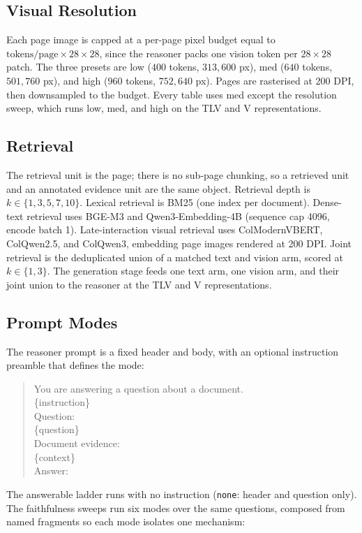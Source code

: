 \subsection{Visual Resolution}
\label{app:cfg_resolution}
Each page image is capped at a per-page pixel budget equal to $\text{tokens/page} \times 28 \times 28$, since the reasoner packs one vision token per $28\times28$ patch. The three presets are low ($400$ tokens, $313{,}600$ px), med ($640$ tokens, $501{,}760$ px), and high ($960$ tokens, $752{,}640$ px). Pages are rasterised at 200 DPI, then downsampled to the budget. Every table uses med except the resolution sweep, which runs low, med, and high on the TLV and V representations.

\subsection{Retrieval}
\label{app:cfg_retrieval}
The retrieval unit is the page; there is no sub-page chunking, so a retrieved unit and an annotated evidence unit are the same object. Retrieval depth is $k \in \{1,3,5,7,10\}$. Lexical retrieval is BM25 (one index per document). Dense-text retrieval uses BGE-M3 and Qwen3-Embedding-4B (sequence cap 4096, encode batch 1). Late-interaction visual retrieval uses ColModernVBERT, ColQwen2.5, and ColQwen3, embedding page images rendered at 200 DPI. Joint retrieval is the deduplicated union of a matched text and vision arm, scored at $k \in \{1,3\}$. The generation stage feeds one text arm, one vision arm, and their joint union to the reasoner at the TLV and V representations.

\subsection{Prompt Modes}
\label{app:cfg_prompts}
The reasoner prompt is a fixed header and body, with an optional instruction preamble that defines the mode:

\begin{quote}\small\ttfamily
You are answering a question about a document.\\
\{instruction\}\\[4pt]
Question:\\
\{question\}\\[4pt]
Document evidence:\\
\{context\}\\[4pt]
Answer:
\end{quote}

The answerable ladder runs with no instruction (\texttt{none}: header and question only). The faithfulness sweeps run six modes over the same questions, composed from named fragments so each mode isolates one mechanism:

